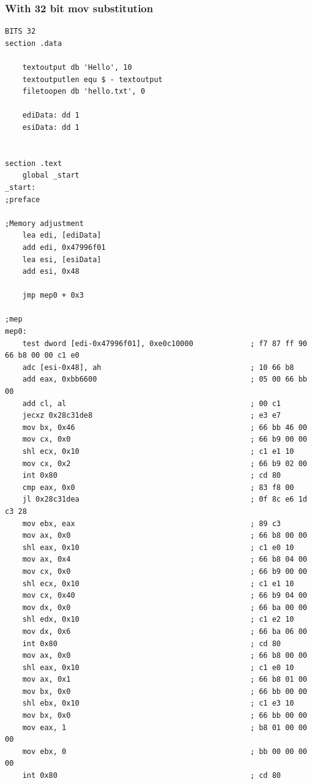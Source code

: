 \documentclass[11pt,twoside]{eitExjobb}
\begin{document}
\subsubsection{With 32 bit mov substitution}
\begin{Verbatim}[fontsize=\tiny]
BITS 32
section .data

    textoutput db 'Hello', 10
    textoutputlen equ $ - textoutput
    filetoopen db 'hello.txt', 0

    ediData: dd 1
    esiData: dd 1


section .text
    global _start
_start:
;preface

;Memory adjustment 
    lea edi, [ediData]
    add edi, 0x47996f01
    lea esi, [esiData]
    add esi, 0x48

    jmp mep0 + 0x3

;mep
mep0:
    test dword [edi-0x47996f01], 0xe0c10000             ; f7 87 ff 90 66 b8 00 00 c1 e0
    adc [esi-0x48], ah                                  ; 10 66 b8
    add eax, 0xbb6600                                   ; 05 00 66 bb 00
    add cl, al                                          ; 00 c1
    jecxz 0x28c31de8                                    ; e3 e7
    mov bx, 0x46                                        ; 66 bb 46 00
    mov cx, 0x0                                         ; 66 b9 00 00
    shl ecx, 0x10                                       ; c1 e1 10
    mov cx, 0x2                                         ; 66 b9 02 00
    int 0x80                                            ; cd 80
    cmp eax, 0x0                                        ; 83 f8 00
    jl 0x28c31dea                                       ; 0f 8c e6 1d c3 28
    mov ebx, eax                                        ; 89 c3
    mov ax, 0x0                                         ; 66 b8 00 00
    shl eax, 0x10                                       ; c1 e0 10
    mov ax, 0x4                                         ; 66 b8 04 00
    mov cx, 0x0                                         ; 66 b9 00 00
    shl ecx, 0x10                                       ; c1 e1 10
    mov cx, 0x40                                        ; 66 b9 04 00
    mov dx, 0x0                                         ; 66 ba 00 00 
    shl edx, 0x10                                       ; c1 e2 10
    mov dx, 0x6                                         ; 66 ba 06 00
    int 0x80                                            ; cd 80
    mov ax, 0x0                                         ; 66 b8 00 00
    shl eax, 0x10                                       ; c1 e0 10
    mov ax, 0x1                                         ; 66 b8 01 00
    mov bx, 0x0                                         ; 66 bb 00 00
    shl ebx, 0x10                                       ; c1 e3 10
    mov bx, 0x0                                         ; 66 bb 00 00
    mov eax, 1                                          ; b8 01 00 00 00
    mov ebx, 0                                          ; bb 00 00 00 00
    int 0x80                                            ; cd 80
\end{Verbatim}
\end{document}
